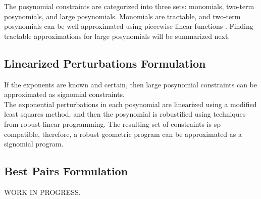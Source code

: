 The posynomial constraints are categorized into three sets: monomials, two-term posynomials, and large posynomials.
Monomials are tractable, and two-term posynomials can be well approximated using piecewise-linear functions \cite{hsiung_kim_boyd_2007}.
Finding tractable approximations for large posynomials will be summarized next.
\subsection{Linearized Perturbations Formulation}
If the exponents are known and certain, then large posynomial constraints can be approximated as signomial constraints. \\
The exponential perturbations in each posynomial are linearized using a modified least squares method, and then the
posynomial is robustified using techniques from robust linear programming. The resulting set of constraints is \gls{sp} compatible,
therefore, a robust geometric program can be approximated as a signomial program.

\subsection{Best Pairs Formulation}

WORK IN PROGRESS.


